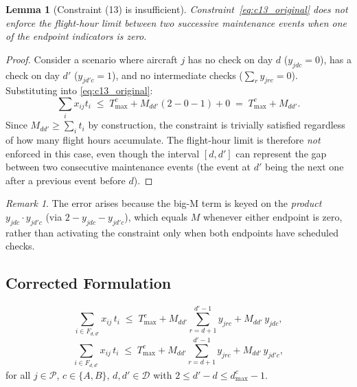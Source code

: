\documentclass[11pt, a4paper]{article}
\theoremstyle{plain}
\newtheorem{lemma}{Lemma}
\theoremstyle{definition}
\theoremstyle{remark}
\newtheorem{remark}{Remark}
\newcommand{\P}{\mathcal{P}}        %
\newcommand{\D}{\mathcal{D}}        %
\begin{document}
\begin{lemma}[Constraint (13) is insufficient]
\label{lem:c13_error}
Constraint~\eqref{eq:c13_original} does \emph{not} enforce the flight-hour
limit between two successive maintenance events when one of the endpoint
indicators is zero.
\end{lemma}
\begin{proof}
Consider a scenario where aircraft $j$ has no check on day $d$ ($y_{jdc}=0$),
has a check on day $d'$ ($y_{jd'c}=1$), and no intermediate checks
($\sum_r y_{jrc}=0$). Substituting into \eqref{eq:c13_original}:
\[
  \sum_i x_{ij} t_i
  \;\leq\; T^c_{\max} + M_{dd'}(2 - 0 - 1) + 0
  \;=\; T^c_{\max} + M_{dd'}.
\]
Since $M_{dd'} \geq \sum_i t_i$ by construction, the constraint is trivially
satisfied regardless of how many flight hours accumulate. The flight-hour
limit is therefore \emph{not} enforced in this case, even though the interval
$[d, d']$ can represent the gap between two consecutive maintenance events
(the event at $d'$ being the next one after a previous event before $d$).
\end{proof}

\begin{remark}
The error arises because the big-M term is keyed on the \emph{product}
$y_{jdc} \cdot y_{jd'c}$ (via $2-y_{jdc}-y_{jd'c}$), which equals $M$ whenever
either endpoint is zero, rather than activating the constraint only when
both endpoints have scheduled checks.
\end{remark}

\subsection{Corrected Formulation}

\begin{equation}
  \sum_{i \in F_{d,d'}} x_{ij}\, t_i
  \;\leq\;
  T^c_{\max}
  + M_{dd'} \sum_{r=d+1}^{d'-1} y_{jrc}
  + M_{dd'}\, y_{jdc},
  \label{eq:c13_corrected_start}
\end{equation}
\begin{equation}
  \sum_{i \in F_{d,d'}} x_{ij}\, t_i
  \;\leq\;
  T^c_{\max}
  + M_{dd'} \sum_{r=d+1}^{d'-1} y_{jrc}
  + M_{dd'}\, y_{jd'c},
  \label{eq:c13_corrected_end}
\end{equation}
for all $j \in \P$, $c \in \{A,B\}$, $d,d' \in \D$ with $2 \leq d'-d \leq d^c_{\max}-1$.
\end{document}
